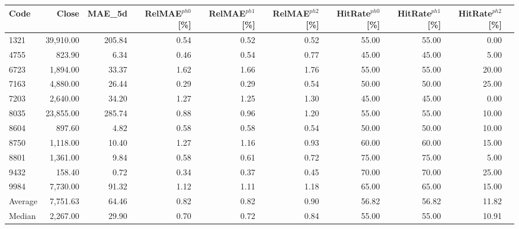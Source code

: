 \begingroup
\footnotesize
\begin{tabular}{lrrrrrrrrr}
\hline
Code & Close & MAE\_5d & RelMAE$^{ph0}$[\%] & RelMAE$^{ph1}$[\%] & RelMAE$^{ph2}$[\%] & HitRate$^{ph0}$[\%] & HitRate$^{ph1}$[\%] & HitRate$^{ph2}$[\%] \\
\hline
1321 & 39,910.00 & 205.84 & 0.54 & 0.52 & 0.52 & 55.00 & 55.00 & 0.00 \\
4755 & 823.90 & 6.34 & 0.46 & 0.54 & 0.77 & 45.00 & 45.00 & 5.00 \\
6723 & 1,894.00 & 33.37 & 1.62 & 1.66 & 1.76 & 55.00 & 55.00 & 20.00 \\
7163 & 4,880.00 & 26.44 & 0.29 & 0.29 & 0.54 & 50.00 & 50.00 & 25.00 \\
7203 & 2,640.00 & 34.20 & 1.27 & 1.25 & 1.30 & 45.00 & 45.00 & 0.00 \\
8035 & 23,855.00 & 285.74 & 0.88 & 0.96 & 1.20 & 55.00 & 55.00 & 10.00 \\
8604 & 897.60 & 4.82 & 0.58 & 0.58 & 0.54 & 50.00 & 50.00 & 10.00 \\
8750 & 1,118.00 & 10.40 & 1.27 & 1.16 & 0.93 & 60.00 & 60.00 & 15.00 \\
8801 & 1,361.00 & 9.84 & 0.58 & 0.61 & 0.72 & 75.00 & 75.00 & 5.00 \\
9432 & 158.40 & 0.72 & 0.34 & 0.37 & 0.45 & 70.00 & 70.00 & 25.00 \\
9984 & 7,730.00 & 91.32 & 1.12 & 1.11 & 1.18 & 65.00 & 65.00 & 15.00 \\
Average & 7,751.63 & 64.46 & 0.82 & 0.82 & 0.90 & 56.82 & 56.82 & 11.82 \\
Median & 2,267.00 & 29.90 & 0.70 & 0.72 & 0.84 & 55.00 & 55.00 & 10.91 \\
\hline
\end{tabular}
\endgroup